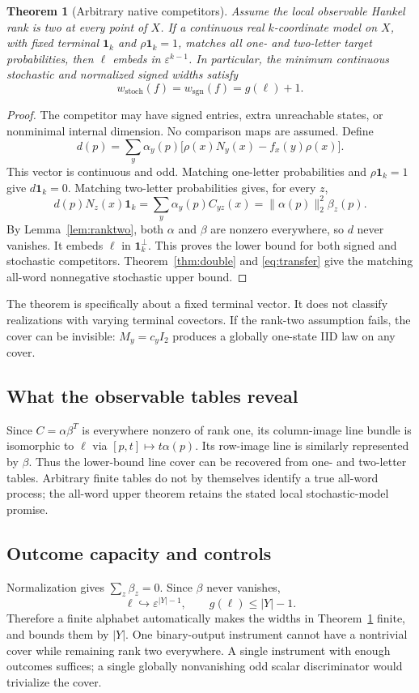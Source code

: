 \documentclass[11pt]{article}
\newtheorem{theorem}{Theorem}[section]
\theoremstyle{definition}
\newcommand{\one}{\mathbf 1}
\newcommand{\eps}{\varepsilon}
\begin{document}
\begin{theorem}[Arbitrary native competitors]\label{thm:native}
Assume the local observable Hankel rank is two at every point of $X$. If a continuous real $k$-coordinate model on $X$, with fixed terminal $\one_k$ and $\rho\one_k=1$, matches all one- and two-letter target probabilities, then $\ell$ embeds in $\eps^{k-1}$. In particular, the minimum continuous stochastic and normalized signed widths satisfy
\[
 w_{\mathrm{stoch}}(f)=w_{\mathrm{sgn}}(f)=g(\ell)+1.
\]
\end{theorem}
\begin{proof}
The competitor may have signed entries, extra unreachable states, or nonminimal internal dimension. No comparison maps are assumed. Define
\begin{equation}\label{eq:extractor}
 d(p)=\sum_y\alpha_y(p)\bigl[\rho(x)N_y(x)-f_x(y)\rho(x)\bigr].
\end{equation}
This vector is continuous and odd. Matching one-letter probabilities and $\rho\one_k=1$ give $d\one_k=0$. Matching two-letter probabilities gives, for every $z$,
\[
 d(p)N_z(x)\one_k
 =\sum_y\alpha_y(p)C_{yz}(x)
 =\|\alpha(p)\|_2^2\beta_z(p).
\]
By Lemma~\ref{lem:ranktwo}, both $\alpha$ and $\beta$ are nonzero everywhere, so $d$ never vanishes. It embeds $\ell$ in $\one_k^\perp$. This proves the lower bound for both signed and stochastic competitors. Theorem~\ref{thm:double} and \eqref{eq:transfer} give the matching all-word nonnegative stochastic upper bound.
\end{proof}

The theorem is specifically about a fixed terminal vector. It does not classify realizations with varying terminal covectors. If the rank-two assumption fails, the cover can be invisible: $M_y=c_yI_2$ produces a globally one-state IID law on any cover.

\subsection{What the observable tables reveal}
Since $C=\alpha\beta^T$ is everywhere nonzero of rank one, its column-image line bundle is isomorphic to $\ell$ via $[p,t]\mapsto t\alpha(p)$. Its row-image line is similarly represented by $\beta$. Thus the lower-bound line cover can be recovered from one- and two-letter tables. Arbitrary finite tables do not by themselves identify a true all-word process; the all-word upper theorem retains the stated local stochastic-model promise.

\subsection{Outcome capacity and controls}
Normalization gives $\sum_z\beta_z=0$. Since $\beta$ never vanishes,
\[
 \ell\hookrightarrow\eps^{|Y|-1},\qquad
 g(\ell)\leq |Y|-1.
\]
Therefore a finite alphabet automatically makes the widths in Theorem~\ref{thm:native} finite, and bounds them by $|Y|$. One binary-output instrument cannot have a nontrivial cover while remaining rank two everywhere. A single instrument with enough outcomes suffices; a single globally nonvanishing odd scalar discriminator would trivialize the cover.
\end{document}

